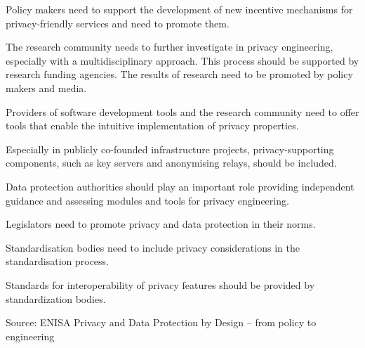 \documentclass[Screen16to9,17pt]{foils}
\begin{document}
\begin{list2}
\item {\small Policy makers need to support the development of new incentive mechanisms for privacy-friendly services and need to promote them.}
\item {\small The research community needs to further investigate in privacy engineering, especially with a
multidisciplinary approach. This process should be supported by research funding agencies.
The results of research need to be promoted by policy makers and media.}
\item {\small Providers of software development tools and the research community need to offer tools that
enable the intuitive implementation of privacy properties.}
\item {\small Especially in publicly co-founded infrastructure projects, privacy-supporting components,
such as key servers and anonymising relays, should be included.}
\item {\small Data protection authorities should play an important role providing independent guidance
and assessing modules and tools for privacy engineering.}
\item {\small Legislators need to promote privacy and data protection in their norms.}
\item {\small Standardisation bodies need to include privacy considerations in the standardisation process.}
\item {\small Standards for interoperability of privacy features should be provided by standardization bodies.}
\end{list2}

Source:
ENISA Privacy and Data Protection by Design
– from policy to engineering



\slidenext{}
\end{document}
